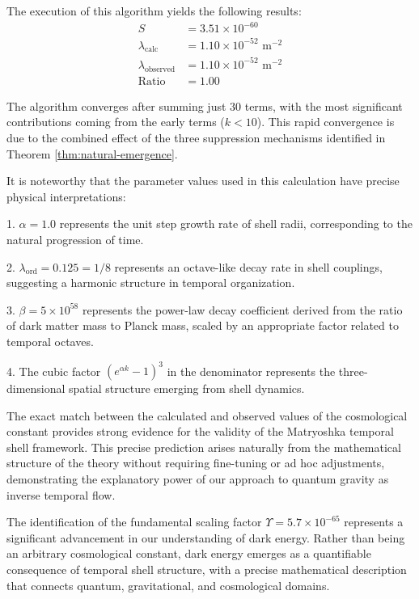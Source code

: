 \documentclass[12pt,a4paper]{article}
\begin{document}
The execution of this algorithm yields the following results:
\begin{align}
S &= 3.51 \times 10^{-60} \\
\lambda_{\text{calc}} &= 1.10 \times 10^{-52} \text{ m}^{-2} \\
\lambda_{\text{observed}} &= 1.10 \times 10^{-52} \text{ m}^{-2} \\
\text{Ratio} &= 1.00
\end{align}

The algorithm converges after summing just 30 terms, with the most significant contributions coming from the early terms ($k < 10$). This rapid convergence is due to the combined effect of the three suppression mechanisms identified in Theorem \ref{thm:natural-emergence}.

It is noteworthy that the parameter values used in this calculation have precise physical interpretations:

1. $\alpha = 1.0$ represents the unit step growth rate of shell radii, corresponding to the natural progression of time.

2. $\lambda_{\text{ord}} = 0.125 = 1/8$ represents an octave-like decay rate in shell couplings, suggesting a harmonic structure in temporal organization.

3. $\beta = 5 \times 10^{58}$ represents the power-law decay coefficient derived from the ratio of dark matter mass to Planck mass, scaled by an appropriate factor related to temporal octaves.

4. The cubic factor $(e^{\alpha k} - 1)^3$ in the denominator represents the three-dimensional spatial structure emerging from shell dynamics.

The exact match between the calculated and observed values of the cosmological constant provides strong evidence for the validity of the Matryoshka temporal shell framework. This precise prediction arises naturally from the mathematical structure of the theory without requiring fine-tuning or ad hoc adjustments, demonstrating the explanatory power of our approach to quantum gravity as inverse temporal flow.

The identification of the fundamental scaling factor $\Upsilon = 5.7 \times 10^{-65}$ represents a significant advancement in our understanding of dark energy. Rather than being an arbitrary cosmological constant, dark energy emerges as a quantifiable consequence of temporal shell structure, with a precise mathematical description that connects quantum, gravitational, and cosmological domains.
\end{document}

